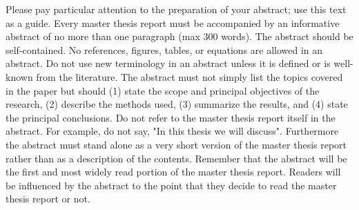 \documentclass[a4paper,11pt]{MScThesis}
\begin{document}
%
\frontmatter %
%
    \maketitle












Please pay particular attention to the preparation of your abstract; use this text as a guide. Every master thesis report must be accompanied by an informative abstract of no more than one paragraph (max 300 words). The abstract should be self-contained. No references, figures, tables, or equations are allowed in an abstract. Do not use new terminology in an abstract unless it is defined or is well-known from the literature. The abstract must not simply list the topics covered in the paper but should (1) state the scope and principal objectives of the research, (2) describe the methods used, (3) summarize the results, and (4) state the principal conclusions. Do not refer to the master thesis report itself in the abstract. For example, do not say, "In this thesis we will discuss". Furthermore the abstract must stand alone as a very short version of the master thesis report rather than as a description of the contents. Remember that the abstract will be the first and most widely read portion of the master thesis report. Readers will be influenced by the abstract to the point that they decide to read the master thesis report or not.
\end{document}
